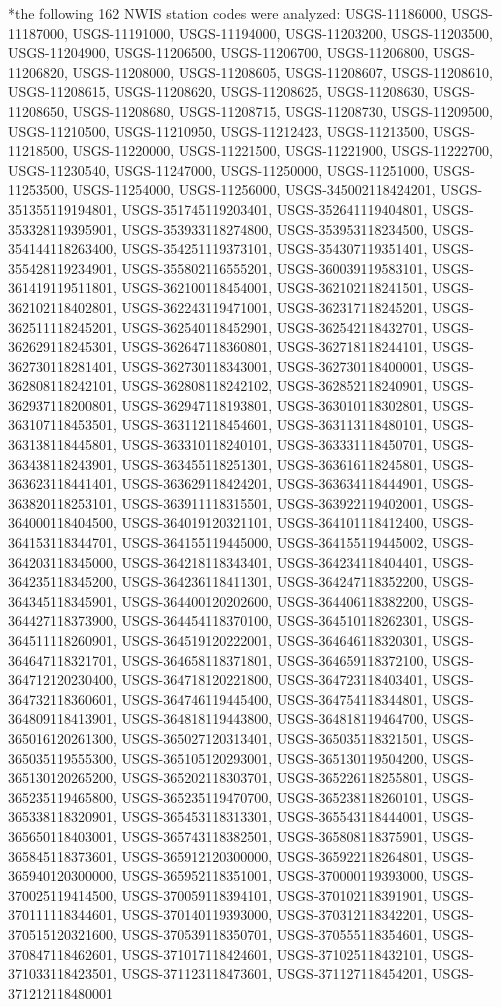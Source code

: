 *the following 162 NWIS station codes were analyzed: USGS-11186000, USGS-11187000, USGS-11191000, USGS-11194000, USGS-11203200, USGS-11203500, USGS-11204900, USGS-11206500, USGS-11206700, USGS-11206800, USGS-11206820, USGS-11208000, USGS-11208605, USGS-11208607, USGS-11208610, USGS-11208615, USGS-11208620, USGS-11208625, USGS-11208630, USGS-11208650, USGS-11208680, USGS-11208715, USGS-11208730, USGS-11209500, USGS-11210500, USGS-11210950, USGS-11212423, USGS-11213500, USGS-11218500, USGS-11220000, USGS-11221500, USGS-11221900, USGS-11222700, USGS-11230540, USGS-11247000, USGS-11250000, USGS-11251000, USGS-11253500, USGS-11254000, USGS-11256000, USGS-345002118424201, USGS-351355119194801, USGS-351745119203401, USGS-352641119404801, USGS-353328119395901, USGS-353933118274800, USGS-353953118234500, USGS-354144118263400, USGS-354251119373101, USGS-354307119351401, USGS-355428119234901, USGS-355802116555201, USGS-360039119583101, USGS-361419119511801, USGS-362100118454001, USGS-362102118241501, USGS-362102118402801, USGS-362243119471001, USGS-362317118245201, USGS-362511118245201, USGS-362540118452901, USGS-362542118432701, USGS-362629118245301, USGS-362647118360801, USGS-362718118244101, USGS-362730118281401, USGS-362730118343001, USGS-362730118400001, USGS-362808118242101, USGS-362808118242102, USGS-362852118240901, USGS-362937118200801, USGS-362947118193801, USGS-363010118302801, USGS-363107118453501, USGS-363112118454601, USGS-363113118480101, USGS-363138118445801, USGS-363310118240101, USGS-363331118450701, USGS-363438118243901, USGS-363455118251301, USGS-363616118245801, USGS-363623118441401, USGS-363629118424201, USGS-363634118444901, USGS-363820118253101, USGS-363911118315501, USGS-363922119402001, USGS-364000118404500, USGS-364019120321101, USGS-364101118412400, USGS-364153118344701, USGS-364155119445000, USGS-364155119445002, USGS-364203118345000, USGS-364218118343401, USGS-364234118404401, USGS-364235118345200, USGS-364236118411301, USGS-364247118352200, USGS-364345118345901, USGS-364400120202600, USGS-364406118382200, USGS-364427118373900, USGS-364454118370100, USGS-364510118262301, USGS-364511118260901, USGS-364519120222001, USGS-364646118320301, USGS-364647118321701, USGS-364658118371801, USGS-364659118372100, USGS-364712120230400, USGS-364718120221800, USGS-364723118403401, USGS-364732118360601, USGS-364746119445400, USGS-364754118344801, USGS-364809118413901, USGS-364818119443800, USGS-364818119464700, USGS-365016120261300, USGS-365027120313401, USGS-365035118321501, USGS-365035119555300, USGS-365105120293001, USGS-365130119504200, USGS-365130120265200, USGS-365202118303701, USGS-365226118255801, USGS-365235119465800, USGS-365235119470700, USGS-365238118260101, USGS-365338118320901, USGS-365453118313301, USGS-365543118444001, USGS-365650118403001, USGS-365743118382501, USGS-365808118375901, USGS-365845118373601, USGS-365912120300000, USGS-365922118264801, USGS-365940120300000, USGS-365952118351001, USGS-370000119393000, USGS-370025119414500, USGS-370059118394101, USGS-370102118391901, USGS-370111118344601, USGS-370140119393000, USGS-370312118342201, USGS-370515120321600, USGS-370539118350701, USGS-370555118354601, USGS-370847118462601, USGS-371017118424601, USGS-371025118432101, USGS-371033118423501, USGS-371123118473601, USGS-371127118454201, USGS-371212118480001


